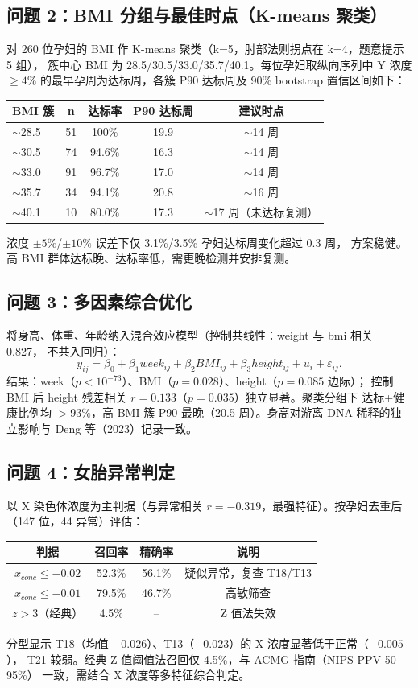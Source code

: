 \documentclass[11pt]{ctexart}
\begin{document}
\subsection{问题 2：BMI 分组与最佳时点（K-means 聚类）}\label{sec:q2}
对 260 位孕妇的 BMI 作 K-means 聚类（k=5，肘部法则拐点在 k=4，题意提示 5 组），
簇中心 BMI 为 28.5/30.5/33.0/35.7/40.1。每位孕妇取纵向序列中 Y 浓度 $\geq 4\%$
的最早孕周为达标周，各簇 P90 达标周及 90\% bootstrap 置信区间如下：
\begin{center}
\begin{tabular}{lcccc}
BMI 簇 & n & 达标率 & P90 达标周 & 建议时点\\
\hline
$\sim$28.5 & 51 & 100\% & 19.9 & $\sim$14 周\\
$\sim$30.5 & 74 & 94.6\% & 16.3 & $\sim$14 周\\
$\sim$33.0 & 91 & 96.7\% & 17.0 & $\sim$14 周\\
$\sim$35.7 & 34 & 94.1\% & 20.8 & $\sim$16 周\\
$\sim$40.1 & 10 & 80.0\% & 17.3 & $\sim$17 周（未达标复测）\\
\end{tabular}
\end{center}
浓度 $\pm5\%$/$\pm10\%$ 误差下仅 3.1\%/3.5\% 孕妇达标周变化超过 0.3 周，
方案稳健。高 BMI 群体达标晚、达标率低，需更晚检测并安排复测。

\subsection{问题 3：多因素综合优化}\label{sec:q3}
将身高、体重、年龄纳入混合效应模型（控制共线性：weight 与 bmi 相关 0.827，
不共入回归）：
\begin{equation}
y_{ij} = \beta_0 + \beta_1 week_{ij} + \beta_2 BMI_{ij} + \beta_3 height_{ij} + u_i + \varepsilon_{ij}.
\label{eq:q3}
\end{equation}
结果：week（$p<10^{-73}$）、BMI（$p=0.028$）、height（$p=0.085$ 边际）；
控制 BMI 后 height 残差相关 $r=0.133$（$p=0.035$）独立显著。聚类分组下
达标+健康比例均 $>93\%$，高 BMI 簇 P90 最晚（20.5 周）。身高对游离 DNA
稀释的独立影响与 Deng 等（2023）记录一致。

\subsection{问题 4：女胎异常判定}\label{sec:q4}
以 X 染色体浓度为主判据（与异常相关 $r=-0.319$，最强特征）。按孕妇去重后
（147 位，44 异常）评估：
\begin{center}
\begin{tabular}{cccc}
判据 & 召回率 & 精确率 & 说明\\
\hline
$x_{conc}\leq-0.02$ & 52.3\% & 56.1\% & 疑似异常，复查 T18/T13\\
$x_{conc}\leq-0.01$ & 79.5\% & 46.7\% & 高敏筛查\\
$z>3$（经典） & 4.5\% & -- & Z 值法失效\\
\end{tabular}
\end{center}
分型显示 T18（均值 $-0.026$）、T13（$-0.023$）的 X 浓度显著低于正常（$-0.005$），
T21 较弱。经典 Z 值阈值法召回仅 4.5\%，与 ACMG 指南（NIPS PPV 50--95\%）
一致，需结合 X 浓度等多特征综合判定。
\end{document}
